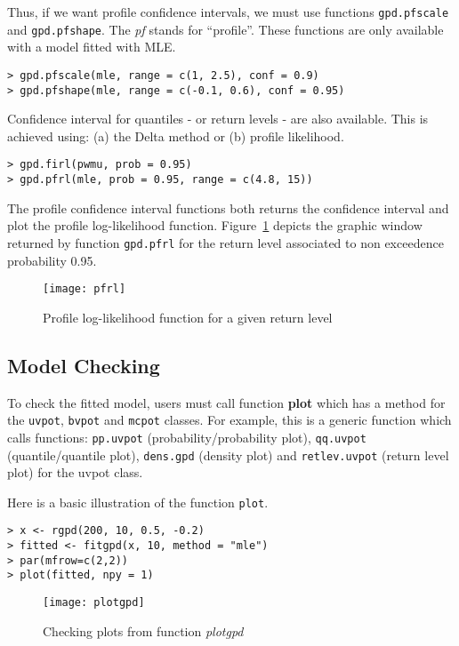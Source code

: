 \documentclass[11pt,a4paper]{article}
\numberwithin{equation}{section}
\theoremstyle{definition}
\begin{document}
Thus, if we want profile confidence intervals, we must use functions
\verb|gpd.pfscale| and \verb|gpd.pfshape|. The \emph{pf} stands for
``profile''. These functions are only available with a model fitted
with MLE.
\begin{verbatim}
> gpd.pfscale(mle, range = c(1, 2.5), conf = 0.9)
> gpd.pfshape(mle, range = c(-0.1, 0.6), conf = 0.95)
\end{verbatim}

Confidence interval for quantiles - or return levels - are also
available. This is achieved using: (a) the Delta method or (b) profile
likelihood.
\begin{verbatim}
> gpd.firl(pwmu, prob = 0.95)
> gpd.pfrl(mle, prob = 0.95, range = c(4.8, 15))
\end{verbatim}

The profile confidence interval functions both returns the confidence
interval and plot the profile log-likelihood
function. Figure~\ref{fig:pfrl} depicts the graphic window returned by
function \verb|gpd.pfrl| for the return level associated to non
exceedence probability 0.95.
\begin{figure}
  \centering
  \texttt{[image: pfrl]}
  \caption{Profile log-likelihood function for a given return level}
  \label{fig:pfrl}
\end{figure}

\subsection{Model Checking}
\label{subsec:modCheck}


To check the fitted model, users must call function \textbf{plot}
which has a method for the \verb|uvpot|, \verb|bvpot| and \verb|mcpot|
classes. For example, this is a generic function which calls
functions: \verb|pp.uvpot| (probability/probability plot),
\verb|qq.uvpot| (quantile/quantile plot), \verb|dens.gpd| (density
plot) and \verb|retlev.uvpot| (return level plot) for the uvpot class.

Here is a basic illustration of the function \verb|plot|.
\begin{verbatim}
> x <- rgpd(200, 10, 0.5, -0.2)
> fitted <- fitgpd(x, 10, method = "mle")
> par(mfrow=c(2,2))
> plot(fitted, npy = 1)
\end{verbatim}

\begin{figure}
  \centering
  \texttt{[image: plotgpd]}
  \caption{Checking plots from function \emph{plotgpd}}
  \label{fig:plotgpd}
\end{figure}
\end{document}
